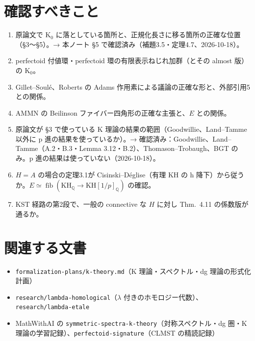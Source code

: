 \documentclass[11pt,a4paper]{ltjsarticle}
\theoremstyle{plain}
\theoremstyle{definition}
\theoremstyle{remark}
\newcommand{\Q}{\mathbb{Q}}
\newcommand{\fib}{\operatorname{fib}}
\begin{document}
\section{確認すべきこと}
\begin{enumerate}
  \item 原論文で K$_0$ に落としている箇所と、正規化長さに移る箇所の正確な位置（§3〜§5）。→ 本ノート §5 で確認済み（補題3.5・定理4.7、2026-10-18）。
  \item perfectoid 付値環・perfectoid 環の有限表示ねじれ加群（とその almost 版）の K$_0$。
  \item Gillet--Soulé、Roberts の Adams 作用素による議論の正確な形と、外部引用5との関係。
  \item AMMN の Beilinson ファイバー四角形の正確な主張と、$E$ との関係。
  \item 原論文が §3 で使っている K 理論の結果の範囲（Goodwillie、Land--Tamme 以外に p 進の結果を使っているか）。→ 確認済み：Goodwillie、Land--Tamme（A.2・B.3・Lemma 3.12・B.2）、Thomason--Trobaugh、BGT のみ。p 進の結果は使っていない（2026-10-18）。
  \item $H=A$ の場合の定理3.1が Cisinski--Déglise（有理 KH の h 降下）から従うか。$E\simeq\fib(\mathrm{KH}_\Q\to\mathrm{KH}[1/p]_\Q)$ の確認。
  \item KST 経路の第2段で、一般の connective な $H$ に対し Thm.~4.11 の係数版が通るか。
\end{enumerate}

\section*{関連する文書}
\begin{itemize}
  \item \texttt{formalization-plans/k-theory.md}（K 理論・スペクトル・dg 理論の形式化計画）
  \item \texttt{research/lambda-homological}（$\lambda$ 付きのホモロジー代数）、\texttt{research/lambda-etale}
  \item MathWithAI の \texttt{symmetric-spectra-k-theory}（対称スペクトル・dg 圏・K 理論の学習記録）、\texttt{perfectoid-signature}（CLMST の精読記録）
\end{itemize}
\end{document}
